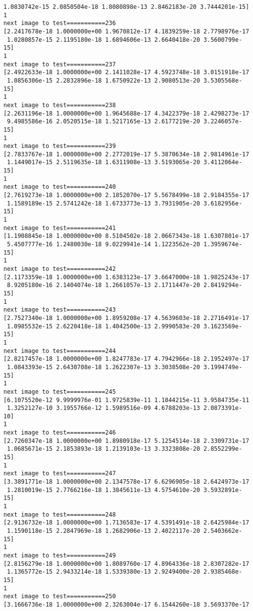 \documentclass[11pt]{article}
\begin{document}
\begin{Verbatim}[commandchars=\\\{\}]
 1.0830742e-15 2.0850504e-18 1.8080898e-13 2.8462183e-20 3.7444201e-15]
1
next image to test===========236
[2.2417678e-18 1.0000000e+00 1.9670812e-17 4.1839259e-18 2.7798976e-17
 1.0280857e-15 2.1195180e-18 1.6894606e-13 2.6640418e-20 3.5600799e-15]
1
next image to test===========237
[2.4922633e-18 1.0000000e+00 2.1411028e-17 4.5923748e-18 3.0151918e-17
 1.0856306e-15 2.2832896e-18 1.6750922e-13 2.9080513e-20 3.5305568e-15]
1
next image to test===========238
[2.2631196e-18 1.0000000e+00 1.9645688e-17 4.3422379e-18 2.4298273e-17
 9.4985586e-16 2.0520515e-18 1.5217165e-13 2.6177219e-20 3.2246057e-15]
1
next image to test===========239
[2.7833767e-18 1.0000000e+00 2.2772019e-17 5.3870634e-18 2.9814961e-17
 1.1449017e-15 2.5119635e-18 1.6311908e-13 3.5193065e-20 3.4112064e-15]
1
next image to test===========240
[2.7619273e-18 1.0000000e+00 2.1852070e-17 5.5678499e-18 2.9184355e-17
 1.1589189e-15 2.5741242e-18 1.6733773e-13 3.7931905e-20 3.6182956e-15]
1
next image to test===========241
[1.1908845e-18 1.0000000e+00 8.5104502e-18 2.0667343e-18 1.6307801e-17
 5.4507777e-16 1.2480030e-18 9.0229941e-14 1.1223562e-20 1.3959674e-15]
1
next image to test===========242
[2.1173359e-18 1.0000000e+00 1.6383123e-17 3.6647000e-18 1.9825243e-17
 8.9205180e-16 2.1404074e-18 1.2661057e-13 2.1711447e-20 2.8419294e-15]
1
next image to test===========243
[2.7527340e-18 1.0000000e+00 1.8959208e-17 4.5639603e-18 2.2716491e-17
 1.0985532e-15 2.6220418e-18 1.4042500e-13 2.9990583e-20 3.1623569e-15]
1
next image to test===========244
[2.8217457e-18 1.0000000e+00 1.8247783e-17 4.7942966e-18 2.1952497e-17
 1.0843393e-15 2.6430708e-18 1.2622307e-13 3.3038508e-20 3.1994749e-15]
1
next image to test===========245
[6.1075520e-12 9.9999976e-01 1.9725839e-11 1.1844215e-11 3.9584735e-11
 1.3252127e-10 3.1955766e-12 1.5989516e-09 4.6788203e-13 2.0873391e-10]
1
next image to test===========246
[2.7260347e-18 1.0000000e+00 1.8980918e-17 5.1254514e-18 2.3309731e-17
 1.0685671e-15 2.1853893e-18 1.2139103e-13 3.3323808e-20 2.8552299e-15]
1
next image to test===========247
[3.3891771e-18 1.0000000e+00 2.1347578e-17 6.6296905e-18 2.6424973e-17
 1.2810019e-15 2.7766216e-18 1.3845611e-13 4.5754610e-20 3.5932891e-15]
1
next image to test===========248
[2.9136732e-18 1.0000000e+00 1.7136583e-17 4.5391491e-18 2.6425984e-17
 1.1590118e-15 2.2847969e-18 1.2682906e-13 2.4022117e-20 2.5403662e-15]
1
next image to test===========249
[2.8156279e-18 1.0000000e+00 1.8089760e-17 4.8964336e-18 2.8307282e-17
 1.1365772e-15 2.9433214e-18 1.5339380e-13 2.9249400e-20 2.9385468e-15]
1
next image to test===========250
[3.1666736e-18 1.0000000e+00 2.3263004e-17 6.1544260e-18 3.5693370e-17

\end{Verbatim}
\end{document}
